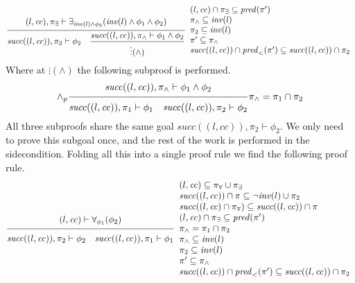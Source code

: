 \documentclass{article}
\newcommand{\proofrule}[3][]{#1 \frac{\raisebox{.7ex}{\normalsize{$#2$}}}
  {\raisebox{-1.0ex}{\normalsize{$#3$}}}}
\newcommand{\placeholder}[1][]{\pi_{#1}}
\newcommand{\loc}{l}
\newcommand{\region}{\mathit{cc}}
\newcommand{\suc}{\mathit{succ}}
\newcommand{\pre}{\mathit{pred}}
\newcommand{\inv}{\mathit{inv}}
\begin{document}
\[
\proofrule
{(\loc, \region), \placeholder[\exists] \vdash \exists_{\inv(\loc) \land \phi_2}(\inv(\loc) \land \phi_1 \land \phi_2)}
{ \suc((\loc, \region)), \placeholder[2] \vdash \phi_2
 \quad
 {\proofrule
  {\suc((\loc, \region)), \placeholder[\land] \vdash \phi_1 \land \phi_2}
  {\vdots (\land)}}
 }
 \begin{array}{l}
  (\loc, \region) \cap \placeholder[\exists] \subseteq \pre(\placeholder') \\
  \placeholder[\land] \subseteq \inv(\loc) \\
  \placeholder[2] \subseteq \inv(\loc) \\
  \placeholder' \subseteq \placeholder[\land] \\
  \suc((\loc, \region)) \cap \pre_{<}(\placeholder') \subseteq \suc((\loc, \region)) \cap \placeholder[2]
  \end{array}
\]
Where at $\vdots (\land)$ the following subproof is performed.
\[
\proofrule[\land_p]
  {\suc((\loc, \region)), \placeholder[\land] \vdash \phi_1 \land \phi_2}
  {\suc((\loc, \region)), \placeholder[1] \vdash \phi_1
    \quad \suc((\loc, \region)), \placeholder[2] \vdash \phi_2}
  \placeholder[\land] = \placeholder[1] \cap \placeholder[2]
\]
All three subproofs share the same goal $\suc((\loc, \region)),\placeholder[2] \vdash \phi_2$. We only need to prove this subgoal once, and the rest of the work is performed in the sidecondition. Folding all this into a single proof rule we find the following proof rule.
\[
\proofrule
{(\loc, \region) \vdash \forall_{\phi_1}(\phi_2)}
{
  \suc((\loc, \region)), \placeholder[2] \vdash \phi_2
  \quad \suc((\loc, \region)), \placeholder[1] \vdash \phi_1
}
\begin{array}{l}
  (\loc, \region) \subseteq \placeholder[\forall] \cup \placeholder[\exists] \\
  \suc((\loc, \region)) \cap \placeholder \subseteq \lnot \inv(\loc) \cup \placeholder[2]\\
  \suc((\loc, \region) \cap \placeholder[\forall]) \subseteq \suc((\loc, \region)) \cap \placeholder \\
  (\loc, \region) \cap \placeholder[\exists] \subseteq \pre(\placeholder') \\
  \placeholder[\land] = \placeholder[1] \cap \placeholder[2] \\
  \placeholder[\land] \subseteq \inv(\loc) \\
  \placeholder[2] \subseteq \inv(\loc) \\
  \placeholder' \subseteq \placeholder[\land] \\
  \suc((\loc, \region)) \cap \pre_{<}(\placeholder') \subseteq \suc((\loc, \region)) \cap \placeholder[2]
\end{array}
\]
\end{document}
